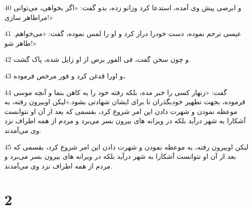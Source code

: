 \par 40 و ابرصی پیش وی آمده، استدعا کرد وزانو زده، بدو گفت: «اگر بخواهی، می‌توانی مراطاهر سازی!»
\par 41 عیسی ترحم نموده، دست خودرا دراز کرد و او را لمس نموده، گفت: «می‌خواهم. طاهر شو!»
\par 42 و چون سخن گفت، فی الفور برص از او زایل شده، پاک گشت.
\par 43 و اورا قدغن کرد و فور مرخص فرموده،
\par 44 گفت: «زنهار کسی را خبر مده، بلکه رفته خود را به کاهن بنما و آنچه موسی فرموده، بجهت تطهیر خودبگذران تا برای ایشان شهادتی بشود.»لیکن اوبیرون رفته، به موعظه نمودن و شهرت دادن این امر شروع کرد، بقسمی که بعد از آن او نتوانست آشکارا به شهر درآید بلکه در ویرانه های بیرون بسر می‌برد و مردم از همه اطراف نزد وی می‌آمدند.
\par 45 لیکن اوبیرون رفته، به موعظه نمودن و شهرت دادن این امر شروع کرد، بقسمی که بعد از آن او نتوانست آشکارا به شهر درآید بلکه در ویرانه های بیرون بسر می‌برد و مردم از همه اطراف نزد وی می‌آمدند.

\chapter{2}

